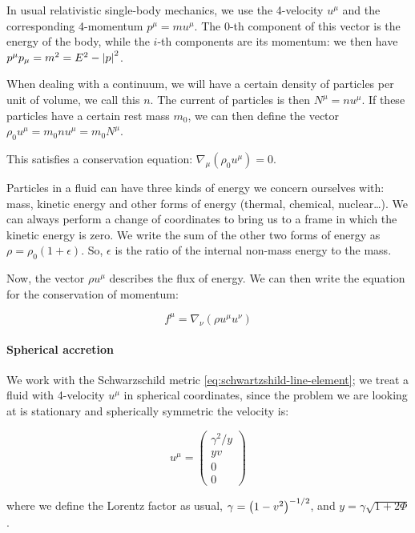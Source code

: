 \documentclass[main.tex]{subfiles}
\begin{document}
In usual relativistic single-body mechanics, we use the 4-velocity $u^\mu$ and the corresponding 4-momentum $p^\mu = m u^\mu$. The 0-th component of this vector is the energy of the body, while the $i$-th components are its momentum: we then have $p^\mu p_\mu = m^2 = E^2 - \abs{p}^2$.

When dealing with a continuum, we will have a certain density of particles per unit of volume, we call this $n$. The current of particles is then $N^\mu = n u^\mu$. If these particles have a certain rest mass $m_0$, we can then define the vector $\rho_0 u^\mu = m_0 n u^\mu = m_0 N^\mu$.

This satisfies a conservation equation: $\nabla_\mu(\rho_0 u^\mu) = 0$.

Particles in a fluid can have three kinds of energy we concern ourselves with: mass, kinetic energy and other forms of energy (thermal, chemical, nuclear\dots).
We can always perform a change of coordinates to bring us to a frame in which the kinetic energy is zero. We write the sum of the other two forms of energy as $\rho = \rho_0 (1+\epsilon)$. So, $\epsilon$ is the ratio of the internal non-mass energy to the mass.

Now, the vector $\rho u^\mu$ describes the flux of energy.
We can then write the equation for the conservation of momentum:

\begin{equation}
    f^\mu = \nabla_\nu (\rho u^\mu u^\nu)
\end{equation}

\paragraph{Spherical accretion}

We work with the Schwarzschild metric \eqref{eq:schwartzshild-line-element}; we treat a fluid with 4-velocity $u^\mu$ in spherical coordinates, since the problem we are looking at is stationary and spherically symmetric the velocity is:

\begin{equation}
    u^\mu = \begin{pmatrix}
        \gamma^2 / y\\
        yv\\
        0\\
        0
    \end{pmatrix}
\end{equation}

where we define the Lorentz factor as usual, $\gamma = \qty(1-v^2)^{-1/2}$, and $y=\gamma \sqrt{1+2\Phi}$.
\end{document}
